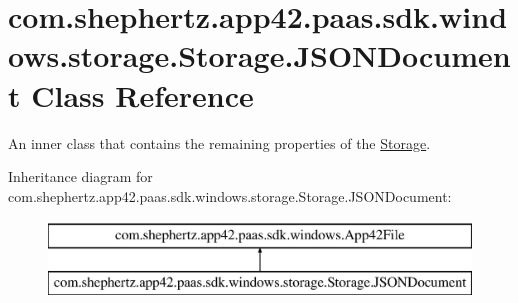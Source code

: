 \hypertarget{classcom_1_1shephertz_1_1app42_1_1paas_1_1sdk_1_1windows_1_1storage_1_1_storage_1_1_j_s_o_n_document}{\section{com.\+shephertz.\+app42.\+paas.\+sdk.\+windows.\+storage.\+Storage.\+J\+S\+O\+N\+Document Class Reference}
\label{classcom_1_1shephertz_1_1app42_1_1paas_1_1sdk_1_1windows_1_1storage_1_1_storage_1_1_j_s_o_n_document}
}


An inner class that contains the remaining properties of the \hyperlink{classcom_1_1shephertz_1_1app42_1_1paas_1_1sdk_1_1windows_1_1storage_1_1_storage}{Storage}.  


Inheritance diagram for com.\+shephertz.\+app42.\+paas.\+sdk.\+windows.\+storage.\+Storage.\+J\+S\+O\+N\+Document\+:\begin{figure}[H]
\begin{center}
\leavevmode
\includegraphics[height=2.000000cm]{classcom_1_1shephertz_1_1app42_1_1paas_1_1sdk_1_1windows_1_1storage_1_1_storage_1_1_j_s_o_n_document}
\end{center}
\end{figure}
